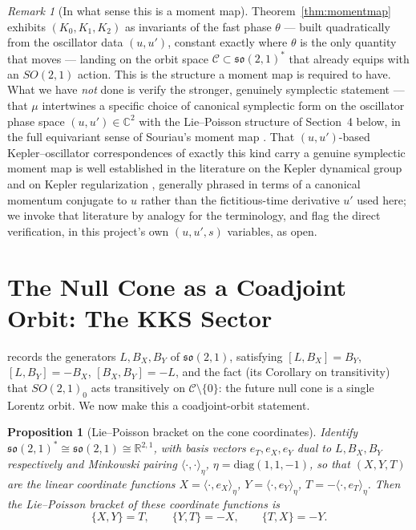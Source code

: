 \documentclass[11pt]{amsart}
\newtheorem{proposition}[theorem]{Proposition}
\theoremstyle{remark}
\newtheorem*{remark}{Remark}
\begin{document}
\begin{remark}[In what sense this is a moment map]
Theorem~\ref{thm:momentmap} exhibits $(K_0,K_1,K_2)$ as invariants of the fast phase $\theta$ --- built quadratically from the oscillator data $(u,u')$, constant exactly where $\theta$ is the only quantity that moves --- landing on the orbit space $\mathcal C\subset\mathfrak{so}(2,1)^*$ that \cite{Ebert2026Cone} already equips with an $SO(2,1)$ action. This is the structure a moment map is required to have. What we have \emph{not} done is verify the stronger, genuinely symplectic statement --- that $\mu$ intertwines a specific choice of canonical symplectic form on the oscillator phase space $(u,u')\in\mathbb C^2$ with the Lie--Poisson structure of Section~4 below, in the full equivariant sense of Souriau's moment map \cite{Souriau1970}. That $(u,u')$-based Kepler--oscillator correspondences of exactly this kind carry a genuine symplectic moment map is well established in the literature on the Kepler dynamical group \cite{BacryRueggSouriau1966} and on Kepler regularization \cite{Moser1970,KustaanheimoStiefel1965}, generally phrased in terms of a canonical momentum conjugate to $u$ rather than the fictitious-time derivative $u'$ used here; we invoke that literature by analogy for the terminology, and flag the direct verification, in this project's own $(u,u',s)$ variables, as open.
\end{remark}

\section{The Null Cone as a Coadjoint Orbit: The KKS Sector}

\cite{Ebert2026Cone} records the generators $L,B_X,B_Y$ of $\mathfrak{so}(2,1)$, satisfying $[L,B_X]=B_Y$, $[L,B_Y]=-B_X$, $[B_X,B_Y]=-L$, and the fact (its Corollary on transitivity) that $SO(2,1)_0$ acts transitively on $\mathcal C\setminus\{0\}$: the future null cone is a single Lorentz orbit. We now make this a coadjoint-orbit statement.

\begin{proposition}[Lie--Poisson bracket on the cone coordinates]\label{prop:bracket}
Identify $\mathfrak{so}(2,1)^*\cong\mathfrak{so}(2,1)\cong\mathbb R^{2,1}$, with basis vectors $e_T,e_X,e_Y$ dual to $L,B_X,B_Y$ respectively and Minkowski pairing $\langle\cdot,\cdot\rangle_\eta$, $\eta=\mathrm{diag}(1,1,-1)$, so that $(X,Y,T)$ are the linear coordinate functions $X=\langle\cdot,e_X\rangle_\eta$, $Y=\langle\cdot,e_Y\rangle_\eta$, $T=-\langle\cdot,e_T\rangle_\eta$. Then the Lie--Poisson bracket of these coordinate functions is
\begin{equation}
\{X,Y\}=T,\qquad \{Y,T\}=-X,\qquad \{T,X\}=-Y. \tag{4.1}
\end{equation}
\end{proposition}
\end{document}
